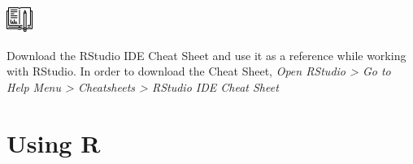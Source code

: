 \begin{minipage}[ht]{0.2\linewidth}
    \includegraphics[width=2\baselineskip]{./viz/icons/Homework.png}  
\end{minipage}%
\begin{minipage}[ht]{0.75\linewidth}
Download the RStudio IDE Cheat Sheet and use it as a reference while working with RStudio. In order to download the Cheat Sheet, \emph{Open RStudio > Go to  Help Menu > Cheatsheets > RStudio IDE Cheat Sheet} 
\end{minipage}

\section{Using R}
\begin{knitrout}
\color{fgcolor}\begin{kframe}
\begin{alltt}
\end{alltt}
\end{kframe}
\end{knitrout}

\begin{knitrout}
\color{fgcolor}\begin{kframe}
\begin{alltt}
\end{alltt}
\end{kframe}
\end{knitrout}

